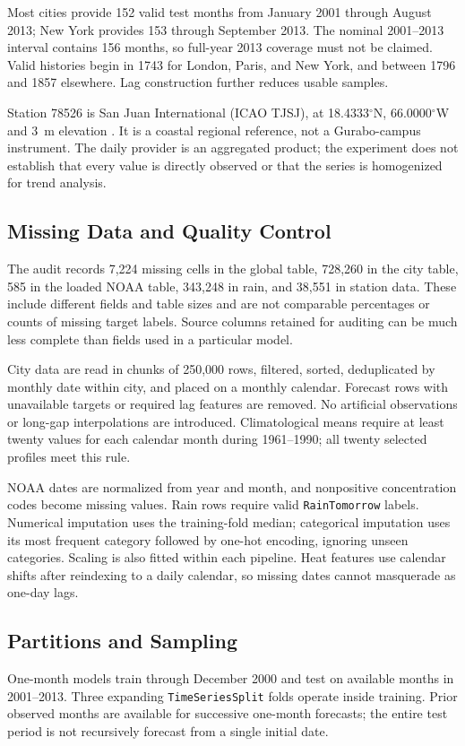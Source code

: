 \documentclass[conference]{IEEEtran}
\begin{document}
Most cities provide 152 valid test months from January 2001 through August 2013; New York provides 153 through September 2013. The nominal 2001--2013 interval contains 156 months, so full-year 2013 coverage must not be claimed. Valid histories begin in 1743 for London, Paris, and New York, and between 1796 and 1857 elsewhere. Lag construction further reduces usable samples.

Station 78526 is San Juan International (ICAO TJSJ), at 18.4333$^\circ$N, 66.0000$^\circ$W and 3~m elevation \cite{meteostat}. It is a coastal regional reference, not a Gurabo-campus instrument. The daily provider is an aggregated product; the experiment does not establish that every value is directly observed or that the series is homogenized for trend analysis.

\subsection{Missing Data and Quality Control}
The audit records 7,224 missing cells in the global table, 728,260 in the city table, 585 in the loaded NOAA table, 343,248 in rain, and 38,551 in station data. These include different fields and table sizes and are not comparable percentages or counts of missing target labels. Source columns retained for auditing can be much less complete than fields used in a particular model.

City data are read in chunks of 250,000 rows, filtered, sorted, deduplicated by monthly date within city, and placed on a monthly calendar. Forecast rows with unavailable targets or required lag features are removed. No artificial observations or long-gap interpolations are introduced. Climatological means require at least twenty values for each calendar month during 1961--1990; all twenty selected profiles meet this rule.

NOAA dates are normalized from year and month, and nonpositive concentration codes become missing values. Rain rows require valid \texttt{RainTomorrow} labels. Numerical imputation uses the training-fold median; categorical imputation uses its most frequent category followed by one-hot encoding, ignoring unseen categories. Scaling is also fitted within each pipeline. Heat features use calendar shifts after reindexing to a daily calendar, so missing dates cannot masquerade as one-day lags.

\subsection{Partitions and Sampling}
One-month models train through December 2000 and test on available months in 2001--2013. Three expanding \texttt{TimeSeriesSplit} folds operate inside training. Prior observed months are available for successive one-month forecasts; the entire test period is not recursively forecast from a single initial date.
\end{document}
